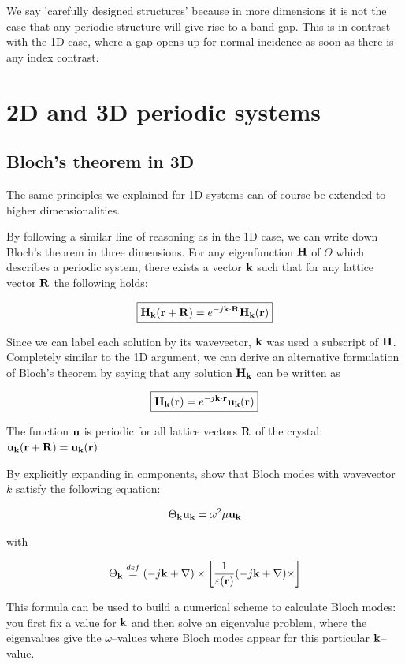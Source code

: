 We say 'carefully designed structures' because in more dimensions it is not the case that any periodic structure will give rise to a band gap. This is in contrast with the 1D case, where a gap opens up for normal incidence as soon as there is any index contrast.

\section{2D and 3D periodic systems}

\subsection{Bloch's theorem in 3D}

The same principles we explained for 1D systems can of course be extended to higher dimensionalities.

By following a similar line of reasoning as in the 1D case, we can write down Bloch's theorem in three dimensions. For any eigenfunction ${\bf H}$ of $\Theta$ which describes a periodic system, there exists a vector ${\bf k}$ such that for any lattice vector ${\bf R}$ the following holds:

\begin{equation}
\fbox{$\displaystyle
{\bf H}_{\bf k} ({\bf r}+ {\bf R}) = e^{-j {\bf k} \cdot {\bf R}} {\bf H}_{\bf k} ({\bf r})
$}
\end{equation} 

Since we can label each solution by its wavevector, ${\bf k}$ was used a subscript of ${\bf H}$. 
Completely similar to the 1D argument, we can derive an alternative formulation of Bloch's theorem by saying that any solution ${\bf H}_{\bf k}$ can be written as

\begin{equation}
\fbox{$\displaystyle
{\bf H}_{\bf k} ({\bf r}) = e^{-j {\bf k} \cdot {\bf r}} {\bf u}_{\bf k} ({\bf r})
$}
\end{equation} 

The function ${\bf u}$ is periodic for all lattice vectors ${\bf R}$ of the crystal: ${\bf u}_{\bf k} ({\bf r} + {\bf R})  = {\bf u}_{\bf k} ({\bf r})$

\begin{sidebar}
\begin{ex}
By explicitly expanding in components, show that Bloch modes with wavevector $k$ satisfy the following equation:

$$\Theta_{\bf k} {\bf u}_{\bf k} = \omega^2 \mu {\bf u}_{\bf k}$$

with

$$\Theta_{\bf k} \stackrel{def}{=} (-j {\bf k} + \nabla) \times \left [ \frac{1}{\varepsilon({\bf r})}(-j{\bf k} +\nabla) \times \right ]$$

This formula can be used to build a numerical scheme to calculate Bloch modes: you first fix a value for ${\bf k}$ and then solve an eigenvalue problem, where the eigenvalues give the $\omega$--values where Bloch modes appear for this particular ${\bf k}$--value.

\end{ex}
\end{sidebar}


